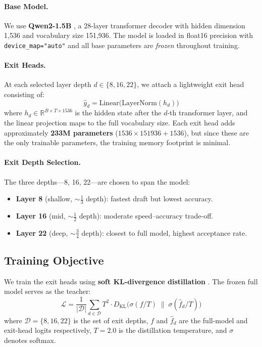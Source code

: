 \documentclass[11pt]{article}
\begin{document}
\paragraph{Base Model.}  We use \textbf{Qwen2-1.5B} \cite{yang2024qwen2}, a 28-layer transformer decoder with hidden dimension 1,536 and vocabulary size 151,936.  The model is loaded in float16 precision with \texttt{device\_map="auto"} and all base parameters are \emph{frozen} throughout training.

\paragraph{Exit Heads.}  At each selected layer depth $d \in \{8, 16, 22\}$, we attach a lightweight exit head consisting of:
\begin{equation}
    \hat{y}_d = \text{Linear}\bigl(\text{LayerNorm}(h_d)\bigr)
\end{equation}
where $h_d \in \mathbb{R}^{B \times T \times 1536}$ is the hidden state after the $d$-th transformer layer, and the linear projection maps to the full vocabulary size.  Each exit head adds approximately \textbf{233M parameters} ($1536 \times 151936 + 1536$), but since these are the only trainable parameters, the training memory footprint is minimal.

\paragraph{Exit Depth Selection.}  The three depths—8, 16, 22—are chosen to span the model:
\begin{itemize}
    \item \textbf{Layer 8} (shallow, $\sim\frac{1}{3}$ depth): fastest draft but lowest accuracy.
    \item \textbf{Layer 16} (mid, $\sim\frac{1}{2}$ depth): moderate speed--accuracy trade-off.
    \item \textbf{Layer 22} (deep, $\sim\frac{3}{4}$ depth): closest to full model, highest acceptance rate.
\end{itemize}

\subsection{Training Objective}

We train the exit heads using \textbf{soft KL-divergence distillation} \cite{hinton2015distilling}.  The frozen full model serves as the teacher:
\begin{equation}
    \mathcal{L} = \frac{1}{|\mathcal{D}|} \sum_{d \in \mathcal{D}} T^2 \cdot D_{\text{KL}}\bigl(\sigma(f / T) \;\|\; \sigma(\hat{f}_d / T)\bigr)
\label{eq:loss}
\end{equation}
where $\mathcal{D} = \{8, 16, 22\}$ is the set of exit depths, $f$ and $\hat{f}_d$ are the full-model and exit-head logits respectively, $T = 2.0$ is the distillation temperature, and $\sigma$ denotes softmax.
\end{document}
